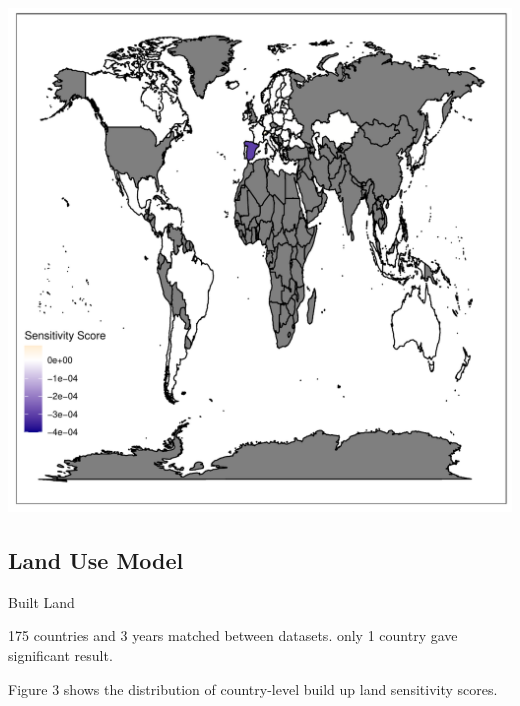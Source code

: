 \documentclass[11pt, a4paper, titlepage]{article}
\begin{document}
	\includegraphics[scale=0.95]{../images/pollutionsensitivitymapgradient.pdf}
	
	\subsection*{Land Use Model}
	Built Land \newline
	
	175 countries and 3 years matched between datasets. only 1 country gave significant result.
	
	Figure 3 shows the distribution of country-level build up land sensitivity scores. \newline
	
\end{document}
